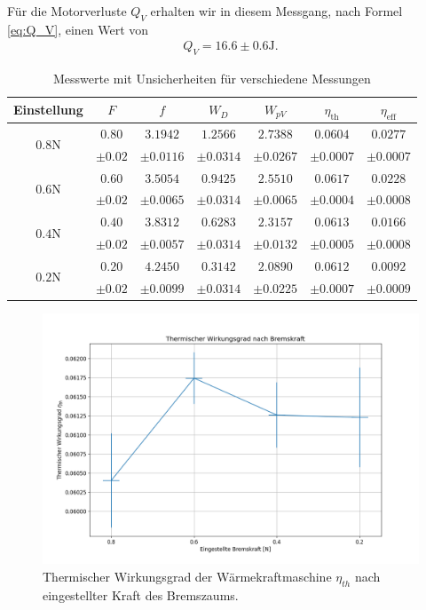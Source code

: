 Für die Motorverluste $Q_V$ erhalten wir in diesem Messgang, nach Formel \eqref{eq:Q_V}, einen Wert von
\begin{align}
    Q_V = 16.6 ± 0.6 \si{\joule}.
\end{align}

\begin{table}[H]
    \centering
    \caption{Messwerte mit Unsicherheiten für verschiedene Messungen}
    \begin{tabular}{c c c c c c c}
    \toprule
    \textbf{Einstellung} & \boldmath$F$ & \boldmath$f$ & \boldmath$W_D$ & \boldmath$W_{pV}$ & \boldmath$\eta_{\text{th}}$ & \boldmath$\eta_{\text{eff}}$ \\
    \midrule
    \multirow{2}{*}{\boldmath$0.8\si{\newton}$} & $0.80$ & $3.1942$ & $1.2566$ & $2.7388$ & $0.0604$ & $0.0277$ \\
     & $\pm 0.02$ & $\pm 0.0116$ & $\pm 0.0314$ & $\pm 0.0267$ & $\pm 0.0007$ & $\pm 0.0007$ \\
    \midrule
    \multirow{2}{*}{\boldmath$0.6\si{\newton}$} & $0.60$ & $3.5054$ & $0.9425$ & $2.5510$ & $0.0617$ & $0.0228$ \\
     & $\pm 0.02$ & $\pm 0.0065$ & $\pm 0.0314$ & $\pm 0.0065$ & $\pm 0.0004$ & $\pm 0.0008$ \\
    \midrule
    \multirow{2}{*}{\boldmath$0.4\si{\newton}$} & $0.40$ & $3.8312$ & $0.6283$ & $2.3157$ & $0.0613$ & $0.0166$ \\
     & $\pm 0.02$ & $\pm 0.0057$ & $\pm 0.0314$ & $\pm 0.0132$ & $\pm 0.0005$ & $\pm 0.0008$ \\
    \midrule
    \multirow{2}{*}{\boldmath$0.2\si{\newton}$} & $0.20$ & $4.2450$ & $0.3142$ & $2.0890$ & $0.0612$ & $0.0092$ \\
     & $\pm 0.02$ & $\pm 0.0099$ & $\pm 0.0314$ & $\pm 0.0225$ & $\pm 0.0007$ & $\pm 0.0009$ \\
    \bottomrule
    \end{tabular}
    \label{tab:messungen}
\end{table}


\begin{figure}[H]
    \centering
    \includegraphics[width=.9\textwidth]{files/eta_th_brems.png}
    \caption{Thermischer Wirkungsgrad der Wärmekraftmaschine $\eta_{th}$ nach eingestellter Kraft des Bremszaums.}
    \label{fig:eta_th_brems}
\end{figure}


